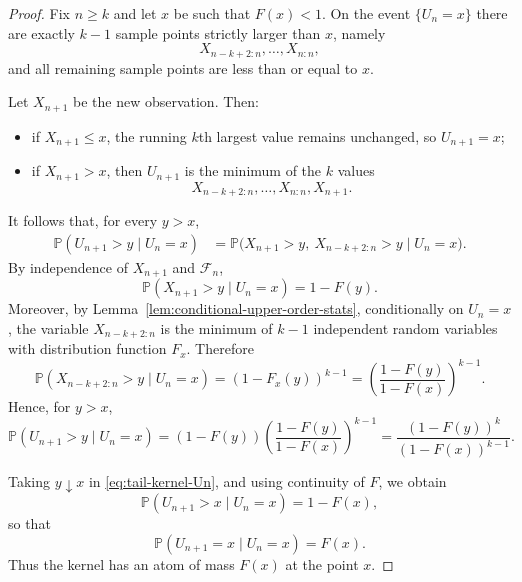 \documentclass[10pt,a4paper]{amsart}
\begin{document}
\begin{proof}
Fix $n\ge k$ and let $x$ be such that $F(x)<1$. On the event $\{U_n=x\}$ there are exactly $k-1$ sample points strictly larger than $x$, namely
\[
X_{n-k+2:n},\dots,X_{n:n},
\]
and all remaining sample points are less than or equal to $x$.

Let $X_{n+1}$ be the new observation. Then:
\begin{itemize}
\item if $X_{n+1}\le x$, the running $k$th largest value remains unchanged, so $U_{n+1}=x$;
\item if $X_{n+1}>x$, then $U_{n+1}$ is the minimum of the $k$ values
\[
X_{n-k+2:n},\dots,X_{n:n},X_{n+1}.
\]
\end{itemize}

It follows that, for every $y>x$,
\begin{align*}
\mathbb{P}(U_{n+1}>y\mid U_n=x)
&=
\mathbb{P}\bigl(X_{n+1}>y,\ X_{n-k+2:n}>y \mid U_n=x\bigr).
\end{align*}
By independence of $X_{n+1}$ and $\mathcal{F}_n$,
\[
\mathbb{P}(X_{n+1}>y\mid U_n=x)=1-F(y).
\]
Moreover, by Lemma~\ref{lem:conditional-upper-order-stats}, conditionally on $U_n=x$, the variable $X_{n-k+2:n}$ is the minimum of $k-1$ independent random variables with distribution function $F_x$. Therefore
\[
\mathbb{P}(X_{n-k+2:n}>y\mid U_n=x)
=
\left(1-F_x(y)\right)^{k-1}
=
\left(\frac{1-F(y)}{1-F(x)}\right)^{k-1}.
\]
Hence, for $y>x$,
\begin{equation}
\label{eq:tail-kernel-Un}
\mathbb{P}(U_{n+1}>y\mid U_n=x)
=
(1-F(y))
\left(\frac{1-F(y)}{1-F(x)}\right)^{k-1}
=
\frac{(1-F(y))^k}{(1-F(x))^{k-1}}.
\end{equation}

Taking $y\downarrow x$ in \eqref{eq:tail-kernel-Un}, and using continuity of $F$, we obtain
\[
\mathbb{P}(U_{n+1}>x\mid U_n=x)=1-F(x),
\]
so that
\[
\mathbb{P}(U_{n+1}=x\mid U_n=x)=F(x).
\]
Thus the kernel has an atom of mass $F(x)$ at the point $x$.


\end{proof}
\end{document}
